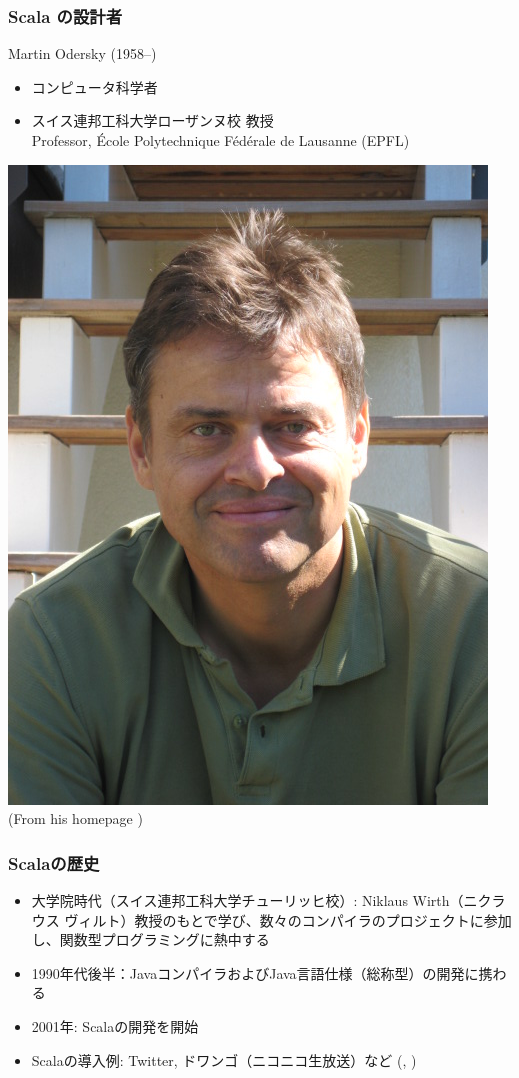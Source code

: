 \documentclass[dvipdfmx]{beamer}
\begin{document}
\begin{frame}
    \frametitle{Scala の設計者}
    Martin Odersky (1958--)
    \begin{itemize}
        \item コンピュータ科学者
        \item スイス連邦工科大学ローザンヌ校 教授\\
        Professor, \'Ecole Polytechnique F\'ed\'erale de Lausanne (EPFL)
    \end{itemize}
    \begin{center}
        \includegraphics[scale=0.5]{Martin.jpeg}\\
        (From his homepage \cite{odersky})
    \end{center}
\end{frame}

\begin{frame}
    \frametitle{Scalaの歴史 \cite{scala-history}}
    \large
    \begin{itemize}
        \item 大学院時代（スイス連邦工科大学チューリッヒ校）: Niklaus Wirth（ニクラウス ヴィルト）教授のもとで学び、数々のコンパイラのプロジェクトに参加し、関数型プログラミングに熱中する
        \item 1990年代後半：JavaコンパイラおよびJava言語仕様（総称型）の開発に携わる
        \item 2001年: Scalaの開発を開始
        \item Scalaの導入例: Twitter, ドワンゴ（ニコニコ生放送）など (\cite{scala-users-jp}, \cite{scala-old})
    \end{itemize}
\end{frame}
\end{document}

